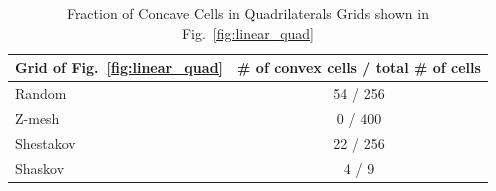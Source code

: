 \documentclass[preprint,10pt]{elsarticle}
\newcommand{\fig}[1]{Fig.~\ref{#1}}                      %
\begin{document}
\begin{table}[htbp]
	\centering
		\begin{tabular}{|l||c|}
		\hline
		Grid  of \fig{fig:linear_quad}    & \# of convex cells / total \# of cells \\ \hline\hline
		Random    & 54 / 256 \\ \hline
		Z-mesh    &  0 / 400 \\ \hline
		Shestakov & 22 / 256 \\ \hline
		Shaskov   &  4 /   9 \\ \hline		
		\end{tabular}
	\caption{Fraction of Concave Cells in Quadrilaterals Grids shown in \fig{fig:linear_quad}}
	\label{tab:FractionOfConcaveCellsInQuadrilateralsGridsShownInFigFig}
\end{table}
\end{document}
